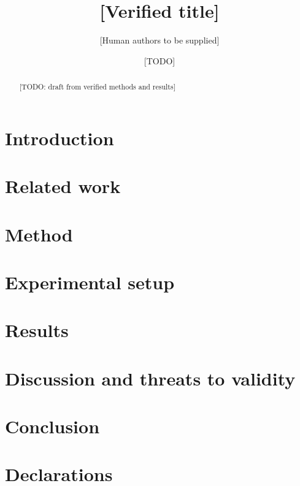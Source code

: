 \documentclass[11pt]{article}
\title{[Verified title]}
\author{[Human authors to be supplied]}
\date{[TODO]}
\begin{document}
\maketitle
\begin{abstract}
[TODO: draft from verified methods and results]
\end{abstract}
\section{Introduction}
\section{Related work}
\section{Method}
\section{Experimental setup}
\section{Results}
\section{Discussion and threats to validity}
\section{Conclusion}
\section*{Declarations}


\end{document}
